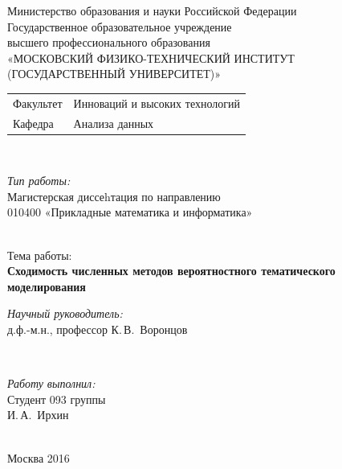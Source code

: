 \documentclass[12pt]{article}
\begin{document}
\begin{titlepage}

\begin{center}

Министерство образования и науки Российской Федерации\\[1em]
Государственное образовательное учреждение\\
высшего профессионального образования \\
«МОСКОВСКИЙ ФИЗИКО-ТЕХНИЧЕСКИЙ ИНСТИТУТ \\
(ГОСУДАРСТВЕННЫЙ УНИВЕРСИТЕТ)»\\[1em]

\begin{minipage}{\textwidth}
\begin{flushleft}
\begin{tabular}{ l l }
Факультет & Инноваций и высоких технологий\\
Кафедра & Анализа данных
\end{tabular}
\end{flushleft}
\end{minipage}\\[1em]

\begin{minipage}{\textwidth}
\begin{flushright}
\textit{Тип работы:}\\
Магистерская диссеhтация по направлению\\
010400 «Прикладные математика и информатика»
\end{flushright}
\end{minipage}\\[5em]


{Тема работы:}\\[1em]
\textbf{\large Сходимость численных методов вероятностного тематического моделирования}\\[6em]

\begin{minipage}{\textwidth}
\begin{flushright}
\textit{Научный руководитель:}\\
\underline{\hspace*{2.5cm}} д.ф.-м.н., профессор К.\,В.~Воронцов
\end{flushright}
\end{minipage}\\[3em]

\begin{minipage}{\textwidth}
\begin{flushright}
\textit{Работу выполнил:}\\
Студент 093 группы\\
\underline{\hspace*{2.5cm}} И.\,А.~Ирхин
\end{flushright}
\end{minipage}\\[3em]

\vfill
{\normalsize Москва 2016}
\end{center}
\end{titlepage}
\end{document}
